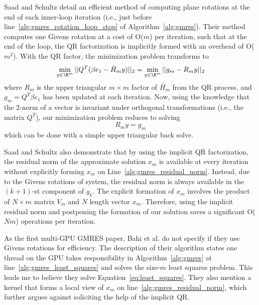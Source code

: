 \documentclass[10pt]{article}
\begin{document}
Saad and Schultz \cite{Saad1986} detail an efficient method of computing plane rotations at the end of each inner-loop iteration (i.e., just before line~\ref{alg:gmres_rotation_loop_stop} of Algorithm~\ref{alg:gmres}). Their method computes one Givens rotation at a cost of O($m$) per iteration, such that at the end of the loop, the QR factorization is implicitly formed with an overhead of O($m^2$). With the QR factor, the minimization problem transforms to 
$$\min_{y \in \R^m} ||Q^T (\beta e_1 - \bar{H}_m y) ||_2 = \min_{y \in \R^m} ||g_m - R_m y||_2$$
where $R_m$ is the upper triangular $m\times m$ factor of $\bar{H}_m$ from the QR process, and $g_m = Q^T \beta e_1$ has been updated at each iteration. Now, using the knowledge that the 2-norm of a vector is invariant under orthogonal transformations (i.e., the matrix $Q^T$), our minimization problem reduces to solving $$ R_m y = g_m $$ which can be done with a simple upper triangular back solve. 

Saad and Schultz \cite{Saad1986} also demonstrate that by using the implicit QR factorization, the residual norm of the approximate solution $x_m$ is available at every iteration without explicitly forming $x_m$ on Line~\ref{alg:gmres_residual_norm}. Instead, due to the Givens rotations of system, the residual norm is always available in the $(k+1)$-st component of $g_k$. The explicit formation of $x_m$ involves the product of $N \times m$ matrix $V_m$ and $N$ length vector $x_m$. Therefore, using the implicit residual norm and postponing the formation of our solution saves a significant O($Nm$) operations per iteration. 

As the first multi-GPU GMRES paper, Bahi et al. \cite{Bahi2011} do not specify if they use Givens rotations for efficiency. The description of their algorithm states one thread on the GPU takes responsibility in Algorithm~\ref{alg:gmres} at line~\ref{alg:gmres_least_squares} and solves the size-$m$ least squares problem. This leads me to believe they solve Equation~\ref{eq:least_squares}. They also mention a kernel that forms a local view of $x_m$ on line~\ref{alg:gmres_residual_norm}, which further argues against soliciting the help of the implicit QR.  
\end{document}
